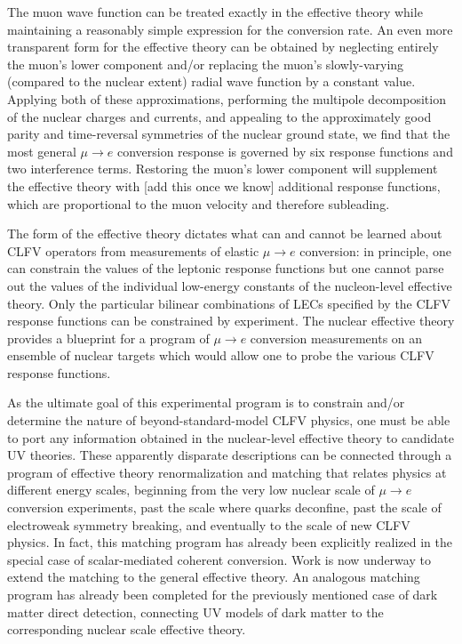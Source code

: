 \documentclass{book}[letterpaper,12pt]
\begin{document}
The muon wave function can be treated exactly in the effective theory while maintaining a reasonably simple expression for the conversion rate. An even more transparent form for the effective theory can be obtained by neglecting entirely the muon's lower component and/or replacing the muon's slowly-varying (compared to the nuclear extent) radial wave function by a constant value. Applying both of these approximations, performing the multipole decomposition of the nuclear charges and currents, and appealing to the approximately good parity and time-reversal symmetries of the nuclear ground state, we find that the most general $\mu\rightarrow e$ conversion response is governed by six response functions and two interference terms. Restoring the muon's lower component will supplement the effective theory with [add this once we know] additional response functions, which are proportional to the muon velocity and therefore subleading.

The form of the effective theory dictates what can and cannot be learned about CLFV operators from measurements of elastic $\mu\rightarrow e$ conversion: in principle, one can constrain the values of the leptonic response functions but one cannot parse out the values of the individual low-energy constants of the nucleon-level effective theory. Only the particular bilinear combinations of LECs specified by the CLFV response functions can be constrained by experiment. The nuclear effective theory provides a blueprint for a program of $\mu\rightarrow e$ conversion measurements on an ensemble of nuclear targets which would allow one to probe the various CLFV response functions.

As the ultimate goal of this experimental program is to constrain and/or determine the nature of beyond-standard-model CLFV physics, one must be able to port any information obtained in the nuclear-level effective theory to candidate UV theories. These apparently disparate descriptions can be connected through a program of effective theory renormalization and matching that relates physics at different energy scales, beginning from the very low nuclear scale of $\mu\rightarrow e$ conversion experiments, past the scale where quarks deconfine, past the scale of electroweak symmetry breaking, and eventually to the scale of new CLFV physics. In fact, this matching program has already been explicitly realized in the special case of scalar-mediated coherent conversion. Work is now underway to extend the matching to the general effective theory. An analogous matching program has already been completed for the previously mentioned case of dark matter direct detection, connecting UV models of dark matter to the corresponding nuclear scale effective theory. 
\end{document}
